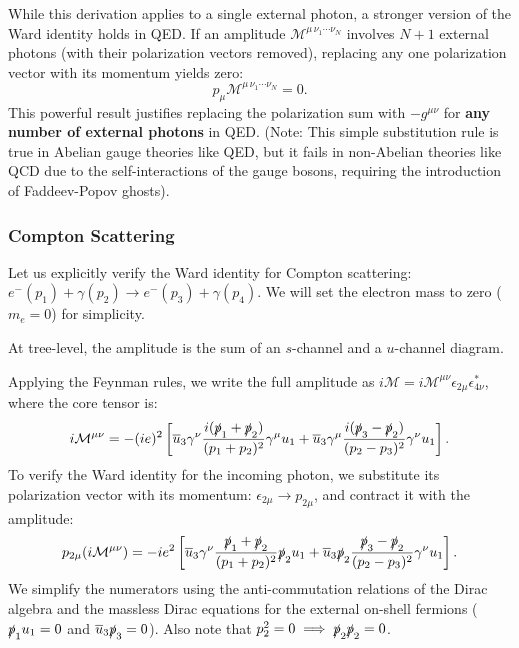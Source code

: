 While this derivation applies to a single external photon, a stronger version of the Ward identity holds in QED. If an amplitude $\mathcal{M}^{\mu\,\nu_1 \cdots \nu_N}$ involves $N+1$ external photons (with their polarization vectors removed), replacing any one polarization vector with its momentum yields zero:
\[
    p_\mu \mathcal{M}^{\mu\,\nu_1 \cdots \nu_N} = 0.
\]
This powerful result justifies replacing the polarization sum with $-g^{\mu\nu}$ for \textbf{any number of external photons} in QED. (Note: This simple substitution rule is true in Abelian gauge theories like QED, but it fails in non-Abelian theories like QCD due to the self-interactions of the gauge bosons, requiring the introduction of Faddeev-Popov ghosts).

\subsubsection{Compton Scattering}

Let us explicitly verify the Ward identity for Compton scattering: \(e^-(p_1) + \gamma(p_2) \to e^-(p_3) + \gamma(p_4)\). We will set the electron mass to zero ($m_e = 0$) for simplicity.

At tree-level, the amplitude is the sum of an $s$-channel and a $u$-channel diagram.

Applying the Feynman rules, we write the full amplitude as $i \mathcal{M} = i \mathcal{M}^{\mu \nu}\epsilon_{2 \mu} \epsilon^*_{4 \nu}$, where the core tensor is:
\[
    i \mathcal{M}^{\mu \nu} = -(ie)^2 \left[\overline{u}_3 \gamma^{\nu} \frac{i (\slashed{p}_1 + \slashed{p}_2)}{(p_1 + p_2)^2}\gamma^{\mu} u_1 + \overline{u}_3 \gamma^{\mu} \frac{i (\slashed{p}_3 - \slashed{p}_2)}{(p_2 - p_3)^2}\gamma^{\nu} u_1 \right].
\]
To verify the Ward identity for the incoming photon, we substitute its polarization vector with its momentum: $\epsilon_{2\mu} \to p_{2\mu}$, and contract it with the amplitude:
\[
    p_{2 \mu} (i \mathcal{M}^{\mu \nu}) = -ie^2 \left[\overline{u}_3 \gamma^{\nu} \frac{\slashed{p}_1 + \slashed{p}_2}{(p_1 + p_2)^2} \slashed{p}_2 u_1 + \overline{u}_3 \slashed{p}_2 \frac{\slashed{p}_3 - \slashed{p}_2}{(p_2 - p_3)^2} \gamma^{\nu} u_1 \right].
\]
We simplify the numerators using the anti-commutation relations of the Dirac algebra and the massless Dirac equations for the external on-shell fermions ($\slashed{p}_1 u_1 = 0$ and $\overline{u}_3 \slashed{p}_3 = 0$). Also note that $p_2^2 = 0 \implies \slashed{p}_2 \slashed{p}_2 = 0$.

